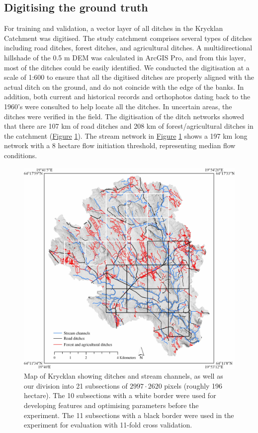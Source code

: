 \documentclass[11pt, review]{elsarticle} %
\begin{document}
\subsection{Digitising the ground truth}
For training and validation, a vector layer of all ditches in the Krycklan Catchment \citep{krycklancatchment} was digitised. The study catchment comprises several types of ditches including road ditches, forest ditches, and agricultural ditches. A multidirectional hillshade of the 0.5 m DEM was calculated in ArcGIS Pro, and from this layer, most of the ditches could be easily identified. We conducted the digitisation at a scale of 1:600 to ensure that all the digitised ditches are properly aligned with the actual ditch on the ground, and do not coincide with the edge of the banks. In addition, both current and historical records and orthophotos dating back to the 1960's were consulted to help locate all the ditches. In uncertain areas, the ditches were verified in the field. The digitisation of the ditch networks showed that there are 107 km of road ditches and 208 km of forest/agricultural ditches in the catchment (\hyperref[fig:swedenkrycklan]{Figure} \ref{fig:swedenkrycklan}). The stream network in \hyperref[fig:swedenkrycklan]{Figure} \ref{fig:swedenkrycklan} shows a 197 km long network with a 8 hectare flow initiation threshold, representing median flow conditions.

\begin{figure}[!htb]
    \centering
    \includegraphics[width=1\linewidth]{./images/Krycklan_lo.jpg}
    \caption{Map of Krycklan showing ditches and stream channels, as well as our division into 21 subsections of $2997 \cdot 2620$ pixels (roughly 196 hectare). The 10 subsections with a white border were used for developing features and optimising parameters before the experiment. The 11 subsections with a black border were used in the experiment for evaluation with 11-fold cross validation.}
    \label{fig:swedenkrycklan}
\end{figure}
\end{document}
